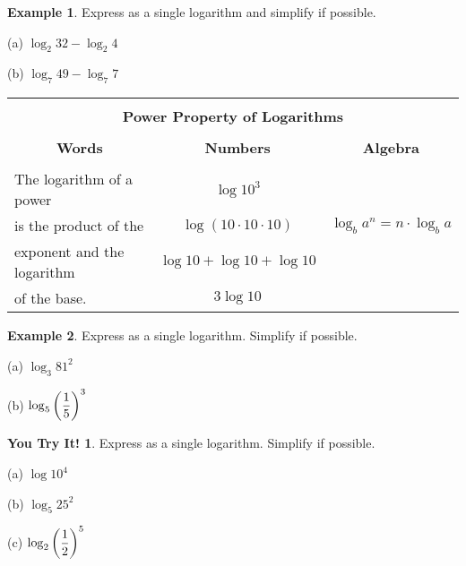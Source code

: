 \documentclass{report}
\theoremstyle{definition}
\newtheorem{example}{\bf Example}
\newtheorem{youtry}{\bf You Try It!}
\begin{document}
\begin{example}
Express as a single logarithm and simplify if possible.
\end{example}
\begin{minipage}[t]{0.45\linewidth}
 (a)  $\log_2 32 - \log _2 4$
\end{minipage}
\begin{minipage}[t]{0.45\linewidth}
 (b) $\log_7 49 - \log_7 7$
\end{minipage}
\vfill

 \newpage


\begin{center}
	\large
	\begin{tabular}[t]{|c|c|c|}
		\hline
		\multicolumn{3}{|c|}{}\\
		\multicolumn{3}{|c|}{\textbf{Power Property of Logarithms}}\\
		\hline
		&&\\
		\textbf{Words} & \textbf{Numbers} & \textbf{Algebra} \\
		\hline
		&&\\
		\multicolumn{1}{|l|}{The logarithm of a power} & $\log 10^3 $ & \\
		\multicolumn{1}{|l|}{ is the product of the  } & $\log (10\cdot 10 \cdot 10)$ &  $\log_b a^n = n\cdot \log_b a $ \\
		\multicolumn{1}{|l|}{exponent and the logarithm} & $\log 10 + \log 10 + \log 10$  &  \\
		\multicolumn{1}{|l|}{ of the base.}&$3\log 10$&\\
		\hline 
	\end{tabular}
	\normalsize
\end{center}

\begin{example}
Express as a single logarithm. Simplify if possible.
\end{example}
\begin{minipage}[t]{0.45\linewidth}
 (a)  $\log_3 81^2$
\end{minipage}
\begin{minipage}[t]{0.45\linewidth}
 (b) $\log_5 \bigg{(}\displaystyle\frac{1}{5} \bigg{)}^3$
\end{minipage}
\vfill

\begin{youtry}
Express as a single logarithm. Simplify if possible.
\end{youtry}
\begin{minipage}[t]{0.3\linewidth}
 (a) $\log10^4$
\end{minipage}
\hfill
\begin{minipage}[t]{0.3\linewidth}
 (b) $\log_5 25^2$
\end{minipage}
\hfill
\begin{minipage}[t]{0.3\linewidth}
 (c) $\log_2 \bigg{(}\displaystyle\frac{1}{2} \bigg{)}^5$
\end{minipage}
\vfill
\end{document}
